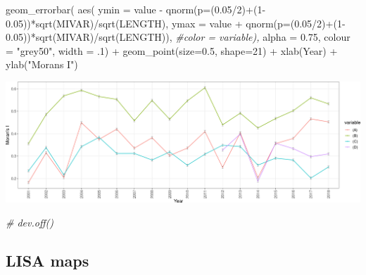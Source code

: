 \documentclass[10pt,landscape,a3paper]{article}
\newenvironment{Shaded}{\begin{snugshade}}{\end{snugshade}}
\newcommand{\AttributeTok}[1]{\textcolor[rgb]{0.77,0.63,0.00}{#1}}
\newcommand{\CommentTok}[1]{\textcolor[rgb]{0.56,0.35,0.01}{\textit{#1}}}
\newcommand{\DecValTok}[1]{\textcolor[rgb]{0.00,0.00,0.81}{#1}}
\newcommand{\FloatTok}[1]{\textcolor[rgb]{0.00,0.00,0.81}{#1}}
\newcommand{\FunctionTok}[1]{\textcolor[rgb]{0.00,0.00,0.00}{#1}}
\newcommand{\NormalTok}[1]{#1}
\newcommand{\SpecialCharTok}[1]{\textcolor[rgb]{0.00,0.00,0.00}{#1}}
\newcommand{\StringTok}[1]{\textcolor[rgb]{0.31,0.60,0.02}{#1}}
\begin{document}
\begin{Shaded}
\begin{Highlighting}[]
  \FunctionTok{geom\_errorbar}\NormalTok{(}
    \FunctionTok{aes}\NormalTok{(}
      \AttributeTok{ymin =}\NormalTok{ value }\SpecialCharTok{{-}} \FunctionTok{qnorm}\NormalTok{(}\AttributeTok{p=}\NormalTok{(}\FloatTok{0.05}\SpecialCharTok{/}\DecValTok{2}\NormalTok{)}\SpecialCharTok{+}\NormalTok{(}\DecValTok{1}\FloatTok{{-}0.05}\NormalTok{))}\SpecialCharTok{*}\FunctionTok{sqrt}\NormalTok{(MIVAR)}\SpecialCharTok{/}\FunctionTok{sqrt}\NormalTok{(LENGTH),}
      \AttributeTok{ymax =}\NormalTok{ value }\SpecialCharTok{+} \FunctionTok{qnorm}\NormalTok{(}\AttributeTok{p=}\NormalTok{(}\FloatTok{0.05}\SpecialCharTok{/}\DecValTok{2}\NormalTok{)}\SpecialCharTok{+}\NormalTok{(}\DecValTok{1}\FloatTok{{-}0.05}\NormalTok{))}\SpecialCharTok{*}\FunctionTok{sqrt}\NormalTok{(MIVAR)}\SpecialCharTok{/}\FunctionTok{sqrt}\NormalTok{(LENGTH)),}
      \CommentTok{\#color = variable),}
    \AttributeTok{alpha =} \FloatTok{0.75}\NormalTok{,}
    \AttributeTok{colour =} \StringTok{"grey50"}\NormalTok{,}
    \AttributeTok{width =}\NormalTok{ .}\DecValTok{1}\NormalTok{) }\SpecialCharTok{+}
  \FunctionTok{geom\_point}\NormalTok{(}\AttributeTok{size=}\FloatTok{0.5}\NormalTok{, }\AttributeTok{shape=}\DecValTok{21}\NormalTok{) }\SpecialCharTok{+} 
  \FunctionTok{xlab}\NormalTok{(}\StringTok{\textquotesingle{}Year\textquotesingle{}}\NormalTok{) }\SpecialCharTok{+}
  \FunctionTok{ylab}\NormalTok{(}\StringTok{"Moran\textquotesingle{}s I"}\NormalTok{)}
\end{Highlighting}
\end{Shaded}

\begin{center}\includegraphics{img/modelling/transformations-2} \end{center}

\begin{Shaded}
\begin{Highlighting}[]
\CommentTok{\# dev.off()}
\end{Highlighting}
\end{Shaded}

\hypertarget{lisa-maps}{%
\subsection{LISA maps}\label{lisa-maps}}
\end{document}
